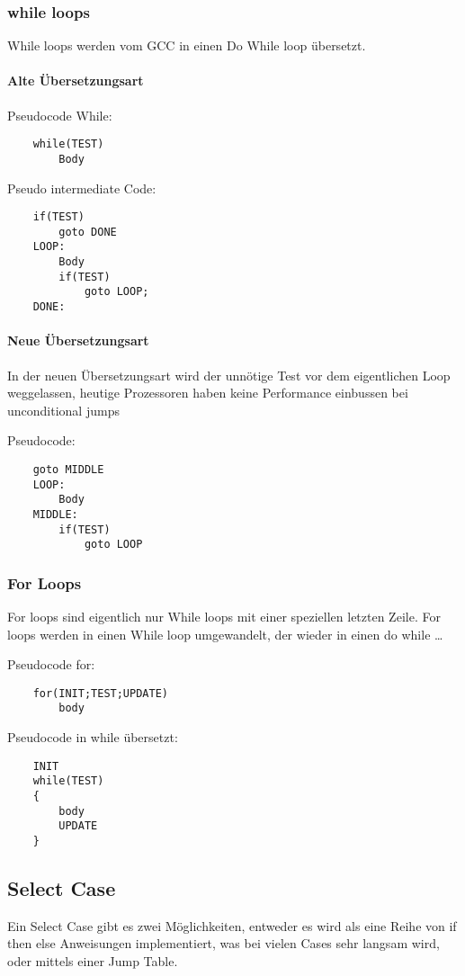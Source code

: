 \documentclass[a4paper, 11pt]{article}
\begin{document}
\subsubsection{while loops}
While loops werden vom GCC in einen Do While loop übersetzt.

\paragraph{Alte Übersetzungsart}
Pseudocode While:
\begin{lstlisting}
	while(TEST)
		Body
\end{lstlisting}

Pseudo intermediate Code:
\begin{lstlisting}
	if(TEST)
		goto DONE
	LOOP:
		Body
		if(TEST)
			goto LOOP;
	DONE:
\end{lstlisting}

\paragraph{Neue Übersetzungsart}
In der neuen Übersetzungsart wird der unnötige Test vor dem eigentlichen Loop weggelassen, heutige Prozessoren haben keine Performance einbussen bei unconditional jumps

Pseudocode:
\begin{lstlisting}
	goto MIDDLE
	LOOP:
		Body
	MIDDLE:
		if(TEST)
			goto LOOP
\end{lstlisting}

\subsubsection{For Loops}
For loops sind eigentlich nur While loops mit einer speziellen letzten Zeile. For loops werden in einen While loop umgewandelt, der wieder in einen do while \ldots

Pseudocode for:
\begin{lstlisting}
	for(INIT;TEST;UPDATE)
		body
\end{lstlisting}

Pseudocode in while übersetzt:
\begin{lstlisting}
	INIT
	while(TEST)
	{
		body
		UPDATE
	}
\end{lstlisting}

\subsection{Select Case}
Ein Select Case gibt es zwei Möglichkeiten, entweder es wird als eine Reihe von if then else Anweisungen implementiert, was bei vielen Cases sehr langsam wird, oder mittels einer Jump Table.
\end{document}
